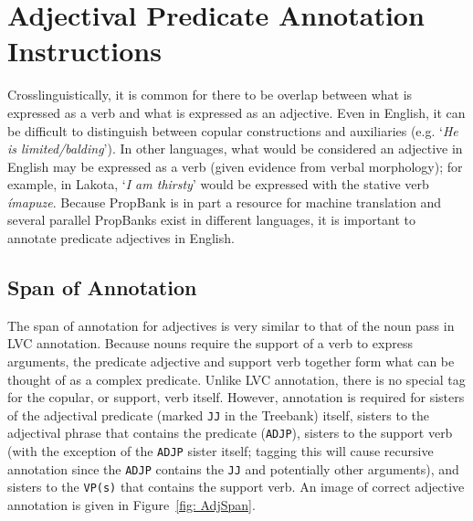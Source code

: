 \documentclass[11pt]{report}
\begin{document}
\chapter{Adjectival Predicate Annotation Instructions}
\label{ch: ADJ Annotation}
Crosslinguistically, it is common for there to be overlap between what is expressed as a verb and what is expressed as an adjective.  Even in English, it can be difficult to distinguish between copular constructions and auxiliaries (e.g. `\textit{He is limited/balding}').  In other languages, what would be considered an adjective in English may be expressed as a verb (given evidence from verbal morphology); for example, in Lakota, `\textit{I am thirsty}' would be expressed with the stative verb \textit{\'{i}mapuze}.  Because PropBank is in part a resource for machine translation and several parallel PropBanks exist in different languages, it is important to annotate predicate adjectives in English.  

\section{Span of Annotation}
The span of annotation for adjectives is very similar to that of the noun pass in LVC annotation.  Because nouns require the support of a verb to express arguments, the predicate adjective and support verb together form what can be thought of as a complex predicate.  Unlike LVC annotation, there is no special tag for the copular, or support, verb itself.  However, annotation is required for sisters of the adjectival predicate (marked \texttt{JJ} in the Treebank) itself, sisters to the adjectival phrase that contains the predicate (\texttt{ADJP}), sisters to the support verb (with the exception of the \texttt{ADJP} sister itself; tagging this will cause recursive annotation since the \texttt{ADJP} contains the \texttt{JJ} and potentially other arguments), and sisters to the \texttt{VP(s)} that contains the support verb.  An image of correct adjective annotation is given in Figure~\ref{fig: AdjSpan}.  
\end{document}
